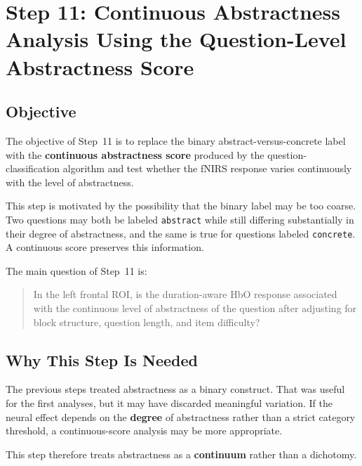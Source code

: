 \section{Step 11: Continuous Abstractness Analysis Using the Question-Level Abstractness Score}
\label{sec:step11_continuous_abstractness}

\subsection{Objective}
The objective of Step~11 is to replace the binary abstract-versus-concrete label with the
\textbf{continuous abstractness score} produced by the question-classification algorithm and test
whether the fNIRS response varies continuously with the level of abstractness.

This step is motivated by the possibility that the binary label may be too coarse.
Two questions may both be labeled \texttt{abstract} while still differing substantially in their
degree of abstractness, and the same is true for questions labeled \texttt{concrete}.
A continuous score preserves this information.

The main question of Step~11 is:
\begin{quote}
In the left frontal ROI, is the duration-aware HbO response associated with the continuous level
of abstractness of the question after adjusting for block structure, question length, and item difficulty?
\end{quote}

\subsection{Why This Step Is Needed}
The previous steps treated abstractness as a binary construct.
That was useful for the first analyses, but it may have discarded meaningful variation.
If the neural effect depends on the \textbf{degree} of abstractness rather than a strict category threshold,
a continuous-score analysis may be more appropriate.

This step therefore treats abstractness as a \textbf{continuum} rather than a dichotomy.

